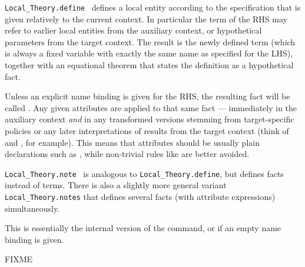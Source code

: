 \begin{isabellebody}
\begin{isamarkuptext}
\begin{description}
  \item \verb|Local_Theory.define|~ defines a local entity according to the specification that is
  given relatively to the current  context.  In
  particular the term of the RHS may refer to earlier local entities
  from the auxiliary context, or hypothetical parameters from the
  target context.  The result is the newly defined term (which is
  always a fixed variable with exactly the same name as specified for
  the LHS), together with an equational theorem that states the
  definition as a hypothetical fact.

  Unless an explicit name binding is given for the RHS, the resulting
  fact will be called .  Any given attributes are
  applied to that same fact --- immediately in the auxiliary context
  \emph{and} in any transformed versions stemming from target-specific
  policies or any later interpretations of results from the target
  context (think of \hyperlink{command.locale}{\mbox{}} and \hyperlink{command.interpretation}{\mbox{}},
  for example).  This means that attributes should be usually plain
  declarations such as \hyperlink{attribute.simp}{\mbox{}}, while non-trivial rules like
  \hyperlink{attribute.simplified}{\mbox{}} are better avoided.

  \item \verb|Local_Theory.note|~ is
  analogous to \verb|Local_Theory.define|, but defines facts instead of
  terms.  There is also a slightly more general variant \verb|Local_Theory.notes| that defines several facts (with attribute
  expressions) simultaneously.

  This is essentially the internal version of the \hyperlink{command.lemmas}{\mbox{}}
  command, or \hyperlink{command.declare}{\mbox{}} if an empty name binding is given.

  \end{description}%
\end{isamarkuptext}%
\isamarkuptrue%
%
\endisatagmlref
{\isafoldmlref}%
%
\isadelimmlref
%
\endisadelimmlref
%
\isamarkuptrue%
%
\begin{isamarkuptext}%
FIXME%
\end{isamarkuptext}%
\isamarkuptrue%
%
\isadelimtheory
%
\endisadelimtheory
%
\isatagtheory
{}\isamarkupfalse%
%
\endisatagtheory
{\isafoldtheory}%
%
\isadelimtheory
%
\endisadelimtheory
\isanewline
\end{isabellebody}%
